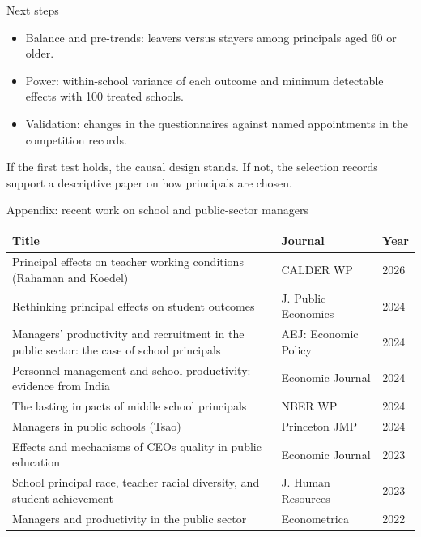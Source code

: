 \documentclass[aspectratio=169,11pt]{beamer}
\begin{document}
\begin{frame}{Next steps}
\vspace{0.4cm}
\begin{itemize}\setlength{\itemsep}{1.1em}
\item Balance and pre-trends: leavers versus stayers among principals aged 60 or older.
\item Power: within-school variance of each outcome and minimum detectable effects with 100 treated schools.
\item Validation: changes in the questionnaires against named appointments in the competition records.
\end{itemize}
\vspace{0.6cm}
If the first test holds, the causal design stands. If not, the selection records support a descriptive paper on how principals are chosen.
\end{frame}

\begin{frame}{Appendix: recent work on school and public-sector managers}
\vspace{-0.1cm}
\scriptsize
\renewcommand{\arraystretch}{1.0}\setlength{\tabcolsep}{4pt}
\begin{tabular}{@{}L{8.3cm}L{3.6cm}L{1.0cm}@{}}
\toprule
\textbf{Title} & \textbf{Journal} & \textbf{Year} \\
\midrule
Principal effects on teacher working conditions (Rahaman and Koedel) & CALDER WP & 2026 \\
Rethinking principal effects on student outcomes & J. Public Economics & 2024 \\
Managers' productivity and recruitment in the public sector: the case of school principals & AEJ: Economic Policy & 2024 \\
Personnel management and school productivity: evidence from India & Economic Journal & 2024 \\
The lasting impacts of middle school principals & NBER WP & 2024 \\
Managers in public schools (Tsao) & Princeton JMP & 2024 \\
Effects and mechanisms of CEOs quality in public education & Economic Journal & 2023 \\
School principal race, teacher racial diversity, and student achievement & J. Human Resources & 2023 \\
Managers and productivity in the public sector & Econometrica & 2022 \\
\bottomrule
\end{tabular}
\end{frame}
\end{document}
